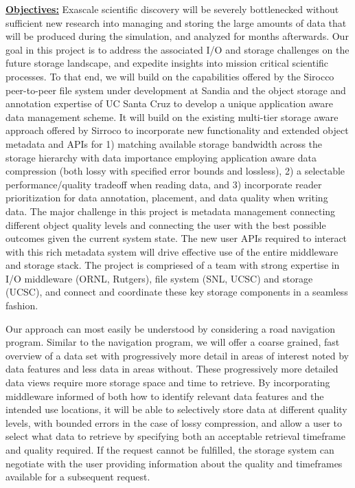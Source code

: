\documentclass[11pt,letterpaper]{article}
\begin{document}
\underline{\textbf{Objectives:}}
Exascale scientific discovery will be severely bottlenecked without sufficient
new research into managing and storing the large amounts of data that will be
produced during the simulation, and analyzed for months afterwards.  Our goal
in this project is to address the associated I/O and storage challenges on the
future storage landscape, and expedite insights into mission critical
scientific processes. To that end, we will build on the capabilities offered
by the Sirocco peer-to-peer file system under development at Sandia and the
object storage and annotation expertise of UC Santa Cruz to develop a unique
application aware data management scheme. It will build on the existing
multi-tier storage aware approach offered by Sirroco to incorporate new
functionality and extended object metadata and APIs for 1) matching available
storage bandwidth across the storage hierarchy with data importance employing
application aware data compression (both lossy with specified error bounds and
lossless), 2) a selectable performance/quality tradeoff when reading data, and
3) incorporate reader prioritization for data annotation, placement, and data
quality when writing data.  The major challenge in this project is metadata
management connecting different object quality levels and connecting the user
with the best possible outcomes given the current system state. The new user
APIs required to interact with this rich metadata system will drive effective
use of the entire middleware and storage stack. The project is compriesed of a
team with strong expertise in I/O middleware (ORNL, Rutgers), file system (SNL,
UCSC) and storage (UCSC), and connect and coordinate these key storage
components in a seamless fashion.

Our approach can most easily be understood by considering a road navigation
program. Similar to the navigation program, we will offer a coarse grained,
fast overview of a data set with progressively more detail in areas of interest
noted by data features and less data in areas without. These progressively
more detailed data views require more storage space and time to retrieve. By
incorporating middleware informed of both how to identify relevant data
features and the intended use locations, it will be able to selectively store
data at different quality levels, with bounded errors in the case of lossy
compression, and allow a user to select what data to retrieve by specifying
both an acceptable retrieval timeframe and quality required. If the request
cannot be fulfilled, the storage system can negotiate with the user providing
information about the quality and timeframes available for a subsequent
request.
\end{document}
